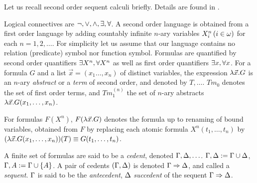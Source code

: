 \documentclass{article}
\begin{document}
Let us recall second order sequent calculi briefly.
Details are found in \cite{Takeuti87}.

Logical connectives are $\lnot,\lor,\land,\exists,\forall$.
A second order language is obtained from a first order language by adding 
countably infinite $n$-ary variables $X^{n}_{i}\,(i\in\omega)$ for each $n=1,2,\ldots$.
For simplicity let us assume that our language contains no relation (predicate) symbol nor function symbol.
Formulas are quantified by second order quantifiers $\exists X^{n},\forall X^{n}$ as well as first order quantifiers $\exists x, \forall x$.
For a formula $G$ and a list $\vec{x}=(x_{1}\ldots,x_{n})$ of distinct variables, the expression $\lambda \vec{x}.G$ 
is an $n$-ary \textit{abstract} or a \textit{term} of second order, and denoted by $T,\ldots$.
$Tm_{0}$ denotes the set of first order terms, and $Tm_{1}^{(n)}$ the set of $n$-ary abstracts $\lambda \vec{x}.G(x_{1},\ldots,x_{n})$.

For formulas $F(X^{n})$, $F(\lambda \vec{x}.G)$ denotes the formula up to renaming of bound variables,
obtained from $F$
by replacing each atomic formula $
X^{n}(t_{1},\ldots,t_{n})$ by $(\lambda \vec{x}. G(x_{1},\ldots,x_{n}))(T)\equiv G(t_{1},\ldots,t_{n})$.



A finite set of formulas are said to be a \textit{cedent}, denoted $\Gamma,\Delta,\ldots$.
$\Gamma,\Delta:=\Gamma\cup\Delta$, $\Gamma,A:=\Gamma\cup\{A\}$.
A pair of cedents  $(\Gamma,\Delta)$ is denoted
$\Gamma\Rightarrow\Delta$, and called a \textit{sequent}.
$\Gamma$ is said to be the \textit{antecedent}, $\Delta$ \textit{succedent} of the sequent $\Gamma\Rightarrow\Delta$.
\end{document}
